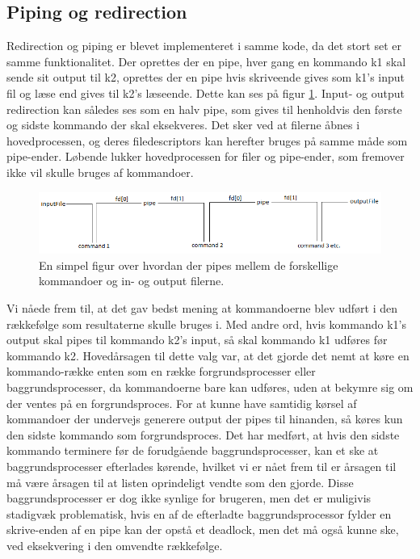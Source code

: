 \subsection{Piping og redirection}
\label{subsec:pipe_redirect}
Redirection og piping er blevet implementeret i samme kode, da det stort set er samme funktionalitet.
Der oprettes der en pipe, hver gang en kommando k1 skal sende sit output til k2, oprettes der en pipe hvis skriveende gives som k1's input fil og læse end gives til k2's læseende. Dette kan ses på figur \ref{fig:pipe}. Input- og output redirection kan således ses som en halv pipe, som gives til henholdvis den første og sidste kommando der skal eksekveres. Det sker ved at filerne åbnes i hovedprocessen, og deres filedescriptors kan herefter bruges på samme måde som pipe-ender. Løbende lukker hovedprocessen for filer og pipe-ender, som fremover ikke vil skulle bruges af kommandoer.


\vspace{1cm}
\begin{figure}
\includegraphics[scale=0.7, trim= 2cm 0cm 0cm 0cm]{pipefig}
\caption{En simpel figur over hvordan der pipes mellem de forskellige kommandoer og in- og output filerne.}
\label{fig:pipe}
\end{figure}

\vspace{1cm}

Vi nåede frem til, at det gav bedst mening at kommandoerne blev udført i den rækkefølge som resultaterne skulle bruges i.
Med andre ord, hvis kommando k1's output skal pipes til kommando k2's input, så skal kommando k1 udføres før kommando k2.
Hovedårsagen til dette valg var, at det gjorde det nemt at køre en kommando-række enten som en række forgrundsprocesser eller baggrundsprocesser, da kommandoerne bare kan udføres, uden at bekymre sig om der ventes på en forgrundsproces. For at kunne have samtidig kørsel af kommandoer der undervejs generere output der pipes til hinanden, så køres kun den sidste kommando som forgrundsproces. Det har medført, at hvis den sidste kommando terminere før de forudgående baggrundsprocesser, kan et ske at baggrundsprocesser efterlades kørende, hvilket vi er nået frem til er årsagen til må være årsagen til at listen oprindeligt vendte som den gjorde. Disse baggrundsprocesser er dog ikke synlige for brugeren, men det er muligivis stadigvæk problematisk, hvis en af de efterladte baggrundsprocessor fylder en skrive-enden af en pipe kan der opstå et deadlock, men det må også kunne ske, ved eksekvering i den omvendte rækkefølge.

